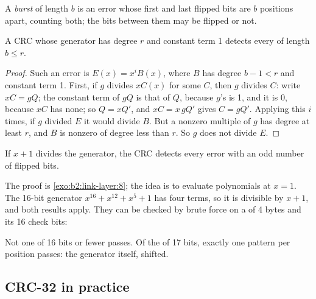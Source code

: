 \begin{definition}\label{def:b2:link-layer:burst}
A \emph{burst} of length $b$ is an error whose first and last flipped bits are $b$ positions apart,
counting both; the bits between them may be flipped or not.
\end{definition}

\begin{theorem}[Bursts]\label{thm:b2:link-layer:crc-burst}
A CRC whose generator has degree $r$ and constant term 1 detects every  of length $b \le r$.
\end{theorem}

\begin{proof}
Such an error is $E(x) = x^i B(x)$, where $B$ has degree $b - 1 < r$ and constant term 1. First, if $g$ divides $x
C(x)$ for some $C$, then $g$ divides $C$: write $xC = gQ$; the constant term of $gQ$ is that of $Q$, because $g$'s is
1, and it is 0, because $xC$ has none; so $Q = xQ'$, and $xC = x\,gQ'$ gives $C = gQ'$. Applying this $i$ times, if
$g$ divided $E$ it would divide $B$. But a nonzero multiple of $g$ has degree at least $r$, and $B$ is nonzero of
degree less than $r$. So $g$ does not divide $E$.
\end{proof}

\begin{proposition}\label{prop:b2:link-layer:crc-odd}
If $x + 1$ divides the generator, the CRC detects every error with an odd number of flipped bits.
\end{proposition}

The proof is \cref{exo:b2:link-layer:8}; the idea is to evaluate polynomials at $x = 1$. The 16-bit generator
$x^{16} + x^{12} + x^5 + 1$ has four terms, so it is divisible by $x + 1$, and both results apply. They can be checked
by brute force on a  of 4 bytes and its 16 check bits:

\label{out:b2:link-layer:bursts}

Not one  of 16 bits or fewer passes. Of the  of 17 bits, exactly one pattern per position passes: the
generator itself, shifted.

\subsection{CRC-32 in practice}

